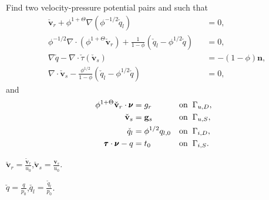\documentclass[usenames,dvipsnames,letterpaper,landscape,final]{slides}
\theoremstyle{definition}
\begin{document}
\begin{myslide}
Find two velocity-pressure potential pairs  and 
 such that 
\begin{equation*}
\begin{alignedat}{2}
		  &\check{\mathbf{v}}_r
		  + \phi^{1+\Theta}\nabla(\phi^{-1/2}\check{q}_l)
        &&= 0,\\
		  &\phi^{-1/2}\nabla \cdot(\phi^{1+\Theta}\check{\mathbf{v}}_r)
        + \frac{1}{1-\phi}(\check{q}_l - \phi^{1/2}\check{q}) &&=0,\\
		  &\nabla \check{q} - \nabla \cdot \check{\tau}(\check{\mathbf{v}}_s) &&= -(1-\phi)\mathbf{n},\\
		  &\nabla \cdot \check{\mathbf{v}}_s
        - \frac{\phi^{1/2}}{1-\phi}(\check{q}_l - \phi^{1/2}\check{q}) &&=0,
\end{alignedat}
\end{equation*}
and
\begin{equation*}\label{eq:bv}
		  \begin{alignedat}{2}
					 \phi^{1+\Theta}\check{\mathbf{v}}_r\cdot \pmb{\nu} &= g_{r} \quad &&\text{on} \hspace{0.2cm} \Gamma_{u,D}, \\
					 \check{\mathbf{v}}_s &= \mathbf{g}_{s} \quad &&\text{on} \hspace{0.2cm} \Gamma_{u,S}, \\
					 \check{q}_l &= \phi^{1/2}q_{l,0} \quad &&\text{on} \hspace{0.2cm} \Gamma_{i,D}, \\
					 \pmb{\tau}\cdot \pmb{\nu} - q &= t_0  \quad &&\text{on} \hspace{0.2cm} \Gamma_{i,S}.
		  \end{alignedat}
\end{equation*}

\begin{blist}
\item $\check{\mathbf{v}}_r = \frac{\tilde{\mathbf{v}}_r}{u_0}$,\quad $\check{\mathbf{v}}_s = \frac{\mathbf{v}_s}{u_0}$. 
\item $\check{q} = \frac{q}{p_0}$,\quad $\check{q_l} = \frac{\tilde{q}_l}{p_0}$.
\end{blist}

\end{myslide}
\end{document}

